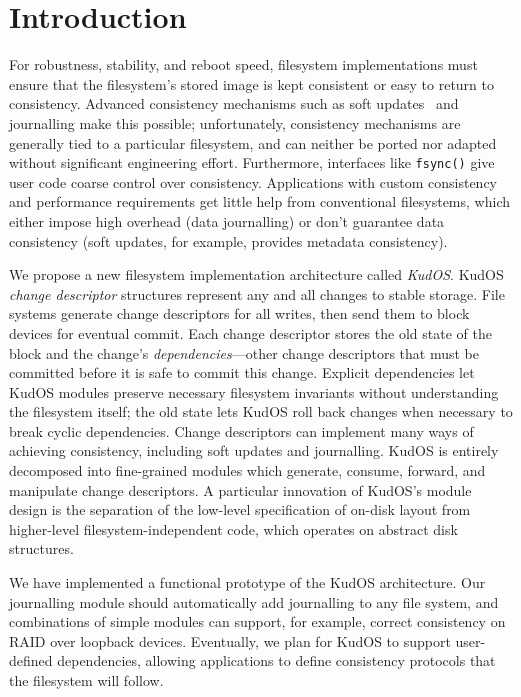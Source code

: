 
\section*{Introduction}
\label{sec:intro}

For robustness, stability, and reboot speed, filesystem implementations
must ensure that the filesystem's stored image is kept consistent
or easy to return to consistency.
%
Advanced consistency mechanisms such as soft updates~\cite{ganger00soft}
and journalling make this possible; unfortunately,
%
consistency mechanisms are generally tied to a particular filesystem, and
can neither be ported nor adapted without significant engineering
effort.
%
Furthermore, interfaces like \verb+fsync()+ give user code coarse control
over consistency.
%
Applications with custom consistency and performance requirements get
little help from conventional filesystems, which either impose high
overhead (data journalling) or don't guarantee data consistency (soft
updates, for example, provides metadata consistency).



We propose a new filesystem implementation architecture called
\emph{KudOS}.
%
KudOS \emph{change descriptor} structures represent any and all changes to
stable storage.
%
File systems generate change descriptors for all writes, then
send them to block devices for eventual commit.
%
Each change descriptor stores the old state of the block and the change's
\emph{dependencies}---other change descriptors that must be committed before
it is safe to commit this change.
%
Explicit dependencies let KudOS modules preserve necessary filesystem
invariants without understanding the filesystem itself; the old state
lets KudOS roll back changes when necessary to break cyclic dependencies.
%
Change descriptors can implement many ways of achieving
consistency, including soft updates and journalling.
%
%
%
KudOS is entirely decomposed into fine-grained modules which generate,
consume, forward, and manipulate change descriptors.
%
A particular innovation of KudOS's module design is the separation of the
low-level specification of on-disk layout from higher-level
filesystem-independent code, which operates on abstract disk
structures.

We have implemented a functional prototype of the KudOS
architecture.
%
Our journalling module should automatically add journalling to any file
system, and combinations of simple modules can support, for example,
correct consistency on RAID over loopback devices.
%
Eventually, we plan for KudOS to support user-defined dependencies,
allowing applications to define consistency protocols that the filesystem
will follow.

%
%
